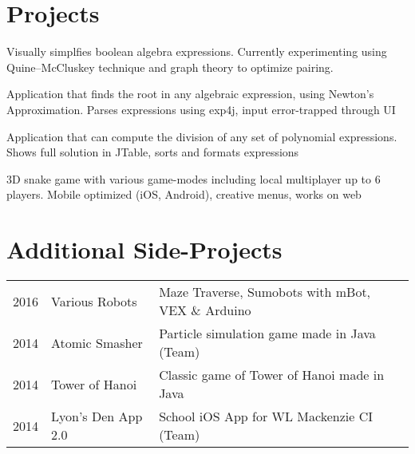 \documentclass[]{deedy-resume-openfont}
\begin{document}
\begin{minipage}[t]{0.66\textwidth}

\section{Projects}

Visually simplfies boolean algebra expressions. Currently experimenting using Quine–McCluskey technique and graph theory to optimize pairing.
\sectionsep


Application that finds the root in any algebraic expression, using Newton's Approximation. Parses expressions using exp4j, input error-trapped through UI
\sectionsep


Application that can compute the division of any set of polynomial expressions. Shows full solution in JTable, sorts and formats expressions
\sectionsep

3D snake game with various game-modes including local multiplayer up to 6 players. Mobile optimized (iOS, Android), creative menus, works on web
\sectionsep

\section{Additional Side-Projects} 

\begin{tabular}{rll}
2016 	& Various Robots    & Maze Traverse, Sumobots with mBot, VEX \& Arduino\\
2014   & Atomic Smasher   & Particle simulation game made in Java (Team)\\
2014   &  Tower of Hanoi  & Classic game of Tower of Hanoi made in Java\\
2014   &  Lyon's Den App 2.0  & School iOS App for WL Mackenzie CI (Team)\\
\end{tabular}
\sectionsep


\end{minipage}
\end{document}
